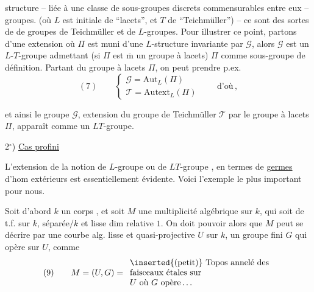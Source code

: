 structure -- liée à une classe de sous-groupes discrets commensurables entre eux --  groupes. (où $L$ est initiale de ``lacets'', et $T$ de ``Teichmüller'') -- ce sont des sortes de  de groupes de Teichmüller et de $L$-groupes. Pour illustrer ce point, partons d'une extension
où $\Pi$ est muni d'une $L$-structure invariante par $\mathcal{G}$, alors $\mathcal{G}$ est un $L$-$T$-groupe admettant (si $\Pi$ est $\overline{\mathrm m}$ un groupe à lacets) $\Pi$ comme sous-groupe de définition. Partant du groupe à lacets $\Pi$, on peut prendre p.ex.
\[
(7)\qquad
\left\{
\begin{array}{l}
\mathcal{G}=\mathrm{Aut}_{L}(\Pi)\\
\mathcal{T}=\mathrm{Autext}_{L}(\Pi)
\end{array}
\right.
\qquad\text{d'où}
\,,
\]

et ainsi le groupe  $\mathcal{G}$, extension du groupe de Teichmüller $\mathcal{T}$ par le groupe à lacets $\Pi$, apparaît comme un $LT$-groupe.


2$^\circ$) \uline{Cas profini}

L'extension de la notion de $L$-groupe ou de $LT$-groupe \inserted{$\Pi$}, en termes de \uline{germes} d'hom extérieurs
est essentiellement évidente. Voici l'exemple le plus important pour nous. 

Soit d'abord $k$ un corps , et soit $M$ une   multiplicité algébrique sur $k$, qui soit  de t.f. sur $k$,  séparée$/k$ et lisse  dim relative $1$. On doit pouvoir  alors que $M$ peut se décrire par une courbe alg. lisse et quasi-projective $U$ sur $k$, un groupe fini  $G$ qui opère sur $U$,  comme
\[
(9)\qquad M=(U,G)=
\begin{array}{l}
\inserted{\text{(petit)}}\text{ Topos annelé des}\\
\text{faisceaux étales sur}\\
U\text{ où }G\text{ opère}\ldots
\end{array}
\]

